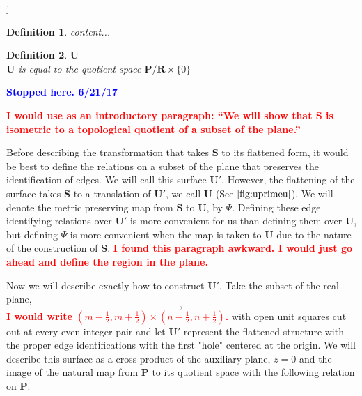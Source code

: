 j\documentclass[]{article}
\newtheorem{Def}{Definition}[subsection]
\newcommand{\compav}[1]{\textbf{\textcolor{blue}{#1}}}
\newcommand{\compat}[1]{\textbf{\textcolor{red}{#1}}}
\begin{document}
\begin{Def}
content...
\end{Def}

\begin{Def}{$\mathbf U$}\\
$\mathbf U$ is equal to the quotient space $\mathbf{P}/\mathbf{R}\times\{0\}$
\end{Def}

\compav{Stopped here. 6/21/17}

\compat{I would use as an introductory paragraph: ``We will show that $\mathbf S$ is isometric to a topological quotient of a subset of the plane.''}

Before describing the transformation that takes $\mathbf{S}$ to its flattened form, it would be best to define the relations on a subset of the plane that preserves the identification of edges. We will call this surface $\mathbf{U}'$. However, the flattening of the surface takes $\mathbf{S}$ to a translation of $\mathbf{U}'$, we call $\mathbf{U}$ (See $\ref{fig:uprimeu}$). We will denote the metric preserving map from $\mathbf{S}$ to $\mathbf{U}$, by $\Psi$. Defining these edge identifying relations over $\mathbf{U}'$ is more convenient for us than defining them over $\mathbf{U}$, but defining $\Psi$ is more convenient when the map is taken to $\mathbf{U}$ due to the nature of the construction of $\mathbf{S}$. \compat{I found this paragraph awkward. I would just go ahead and define the region in the plane.}



Now we will describe exactly how to construct $\mathbf{U}'$. Take the subset of the real plane, 
$$,$$ 
\compat{I would write $(m-\frac{1}{2},m+\frac{1}{2}) \times (n-\frac{1}{2},n+\frac{1}{2})$.}
with open unit squares cut out at every even integer pair and let $\mathbf{U}'$ represent the flattened structure with the proper edge identifications with the first "hole" centered at the origin. We will describe this surface as a cross product of the auxiliary plane, $z=0$ and the image of the natural map from $\mathbf{P}$ to its quotient space with the following relation on $\mathbf{P}$:
\end{document}
